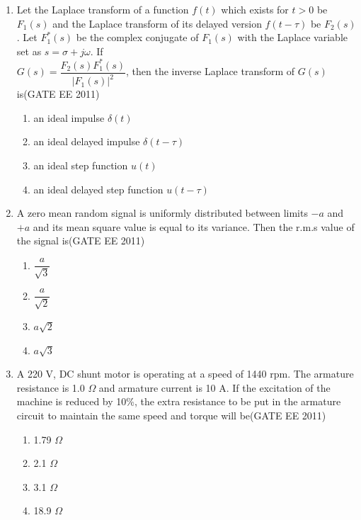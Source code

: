 \documentclass[a4paper,10pt]{exam}
\theoremstyle{remark}
\begin{document}
\begin{enumerate}
\item \quad Let the Laplace transform of a function $f(t)$ which exists for $t>0$ be $F_1(s)$ and the Laplace transform of its delayed version $f(t - \tau)$ be $F_2(s)$. Let $F^*_1(s)$ be the complex conjugate of $F_1(s)$ with the Laplace variable set as $s = \sigma + j \omega$. If \\  \hspace*{2em} $G(s) = \dfrac{F_2(s) F^*_1(s)}{|F_1(s)|^2}$, then the inverse Laplace transform of $G(s)$ is\hfill{(GATE EE 2011)}

\begin{multicols}{2}
\begin{enumerate}
\item an ideal impulse $\delta(t)$
\item an ideal delayed impulse $\delta(t-\tau)$
\item an ideal step function $u(t)$
\item an ideal delayed step function $u(t-\tau)$
\end{enumerate}
\end{multicols}

\item \quad A zero mean random signal is uniformly distributed between limits $-a$ and $+a$ and its mean square value is equal to its variance. Then the r.m.s value of the signal is\hfill{(GATE EE 2011)}

\begin{multicols}{2}
\begin{enumerate}
\item $\dfrac{a}{\sqrt{3}}$
\item $\dfrac{a}{\sqrt{2}}$
\item $a\sqrt{2}$
\item $a\sqrt{3}$
\end{enumerate}
\end{multicols}

\item \quad A 220 V, DC shunt motor is operating at a speed of 1440 rpm. The armature resistance is 1.0 $\Omega$ and armature current is 10 A. If the excitation of the machine is reduced by 10\%, the extra resistance to be put in the armature circuit to maintain the same speed and torque will be\hfill{(GATE EE 2011)}

\begin{multicols}{2}
\begin{enumerate}
\item 1.79 $\Omega$
\item 2.1 $\Omega$
\item 3.1 $\Omega$
\item 18.9 $\Omega$
\end{enumerate}
\end{multicols}


\end{enumerate}
\end{document}
